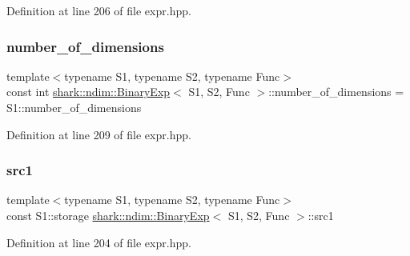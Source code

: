 Definition at line 206 of file expr.\+hpp.

\hypertarget{classshark_1_1ndim_1_1_binary_exp_ad6fb9c3cca071ad98fe87b3c285a17cf}{}\label{classshark_1_1ndim_1_1_binary_exp_ad6fb9c3cca071ad98fe87b3c285a17cf} 
\subsubsection{\texorpdfstring{number\+\_\+of\+\_\+dimensions}{number\_of\_dimensions}}
{\footnotesize\ttfamily template$<$typename S1, typename S2, typename Func$>$ \\
const int \hyperlink{classshark_1_1ndim_1_1_binary_exp}{shark\+::ndim\+::\+Binary\+Exp}$<$ S1, S2, Func $>$\+::number\+\_\+of\+\_\+dimensions = S1\+::number\+\_\+of\+\_\+dimensions\hspace{0.3cm}{\ttfamily [static]}}



Definition at line 209 of file expr.\+hpp.

\hypertarget{classshark_1_1ndim_1_1_binary_exp_adca0646eb1ee123dc4312644a39ffdb6}{}\label{classshark_1_1ndim_1_1_binary_exp_adca0646eb1ee123dc4312644a39ffdb6} 
\subsubsection{\texorpdfstring{src1}{src1}}
{\footnotesize\ttfamily template$<$typename S1, typename S2, typename Func$>$ \\
const S1\+::storage \hyperlink{classshark_1_1ndim_1_1_binary_exp}{shark\+::ndim\+::\+Binary\+Exp}$<$ S1, S2, Func $>$\+::src1\hspace{0.3cm}{\ttfamily [private]}}



Definition at line 204 of file expr.\+hpp.

\hypertarget{classshark_1_1ndim_1_1_binary_exp_a42495dbe9f1fdc13b53fc53d21c847a1}{}\label{classshark_1_1ndim_1_1_binary_exp_a42495dbe9f1fdc13b53fc53d21c847a1} 
